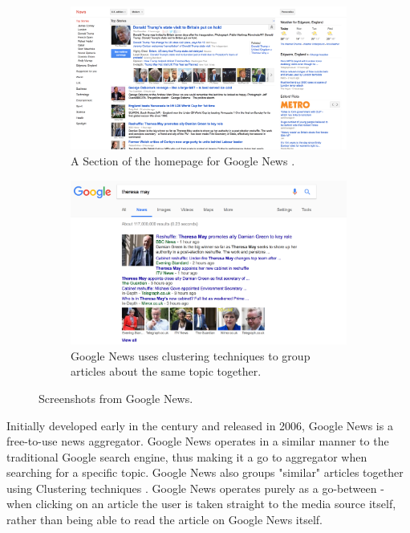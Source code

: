 \documentclass[12pt]{article}
\begin{document}
\begin{figure}[H]
  \centering
  \begin{subfigure}{0.8\textwidth}
        \includegraphics[width=\textwidth]{GoogleHome}
        \caption[Screenshot from the Google News home page]{A Section of the homepage for Google News \cite{googleNews}.}
        \label{GoogleNewsHome}
    \end{subfigure}
    
    \begin{subfigure}{\textwidth}
    \includegraphics[width=\textwidth]{GoogleUber}
   \caption[Screenshots from a Google News search]{Google News uses clustering techniques to group articles about the same topic together. }
   \label{GoogleNewsUber}
   \end{subfigure}
   \caption[Screenshots from Google News]{Screenshots from Google News.}
\end{figure}

Initially developed early in the century and released in 2006, Google News \cite{googleNews} is a free-to-use news aggregator. Google News operates in a similar manner to the traditional Google \cite{google} search engine, thus making it a go to aggregator when searching for a specific topic. Google News also groups "similar" articles together using Clustering techniques \cite{googleClustering}. Google News operates purely as a go-between - when clicking on an article the user is taken straight to the media source itself, rather than being able to read the article on Google News itself. 
\end{document}
